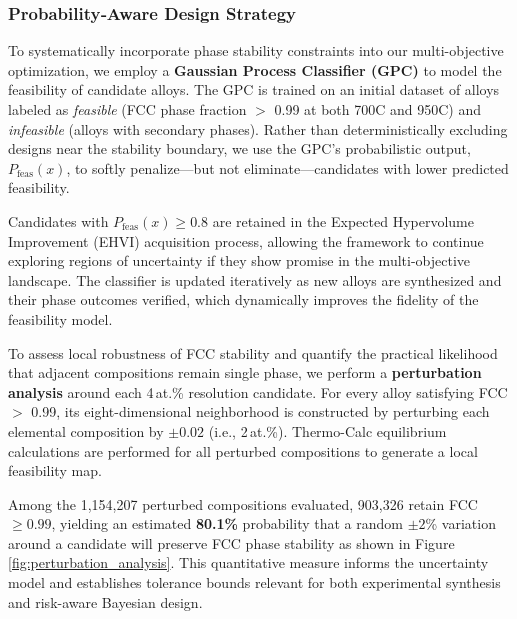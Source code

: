 \subsubsection{Probability‑Aware Design Strategy}

To systematically incorporate phase stability constraints into our multi-objective optimization, we employ a \textbf{Gaussian Process Classifier (GPC)} to model the feasibility of candidate alloys. The GPC is trained on an initial dataset of alloys labeled as \textit{feasible} (FCC phase fraction $>$ 0.99 at both 700\textdegree C and 950\textdegree C) and \textit{infeasible} (alloys with secondary phases). Rather than deterministically excluding designs near the stability boundary, we use the GPC’s probabilistic output, $P_\text{feas}(x)$, to softly penalize—but not eliminate—candidates with lower predicted feasibility. 

Candidates with $P_\text{feas}(x) \geq 0.8$ are retained in the Expected Hypervolume Improvement (EHVI) acquisition process, allowing the framework to continue exploring regions of uncertainty if they show promise in the multi-objective landscape. The classifier is updated iteratively as new alloys are synthesized and their phase outcomes verified, which dynamically improves the fidelity of the feasibility model.


To assess local robustness of FCC stability and quantify the practical likelihood that adjacent compositions remain single phase, we perform a \textbf{perturbation analysis} around each 4\,at.\% resolution candidate. For every alloy satisfying FCC $>$ 0.99, its eight-dimensional neighborhood is constructed by perturbing each elemental composition by $\pm 0.02$ (i.e., 2\,at.\%). Thermo-Calc equilibrium calculations are performed for all perturbed compositions to generate a local feasibility map.

Among the 1,154,207 perturbed compositions evaluated, 903,326 retain FCC $\geq 0.99$, yielding an estimated \textbf{80.1\%} probability that a random $\pm2$\% variation around a candidate will preserve FCC phase stability as shown in Figure \autoref{fig:perturbation_analysis}. This quantitative measure informs the uncertainty model and establishes tolerance bounds relevant for both experimental synthesis and risk-aware Bayesian design.

